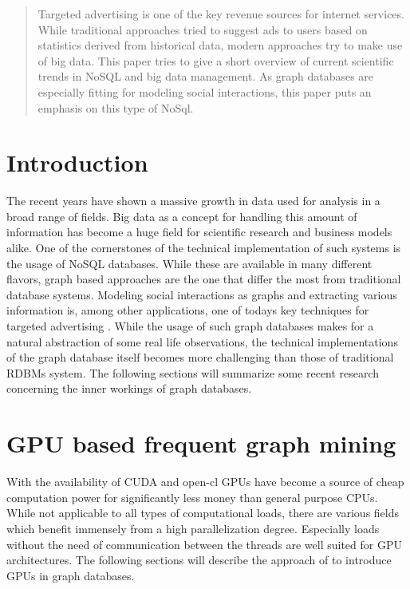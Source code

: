 \documentclass{sig-alternate}
\begin{document}
\maketitle
\begin{abstract}
Targeted advertising is one of the key revenue sources 
for internet services. While traditional approaches tried
to suggest ads to users based on statistics derived from historical data,
modern approaches try to make use of big data.
This paper tries to give a short overview of current scientific trends 
in NoSQL and big data management. As graph databases are especially fitting for 
modeling social interactions, this paper puts an emphasis on this type of NoSql.
\end{abstract}


\section{Introduction}
The recent years have shown a massive growth in data 
used for analysis in a broad range of fields.
Big data as a concept for handling this amount of information
has become a huge field for scientific research and 
business models alike. One of the cornerstones of the technical
implementation of such systems is the usage of NoSQL databases.
While these are available in many different flavors, graph based approaches
are the one that differ the most from traditional database systems.
Modeling social interactions as graphs and extracting various information
is, among other applications, one of todays key techniques for targeted advertising \cite{dia2006mining}.
While the usage of such graph databases makes for a natural abstraction
of some real life observations, the technical implementations
of the graph database itself becomes more challenging than those of
traditional RDBMs system.
The following sections will summarize some recent research concerning 
the inner workings of graph databases.

\section{GPU based frequent graph mining}
With the availability of CUDA and open-cl GPUs have become
a source of cheap computation power for significantly less money 
than general purpose CPUs. While not applicable to all types
of computational loads, there are various fields which benefit 
immensely from a high parallelization degree.
Especially loads without the need of communication between the 
threads are well suited for GPU architectures.
The following sections will describe the approach of \cite{kessl2014parallel}
to introduce GPUs in graph databases.
\end{document}
